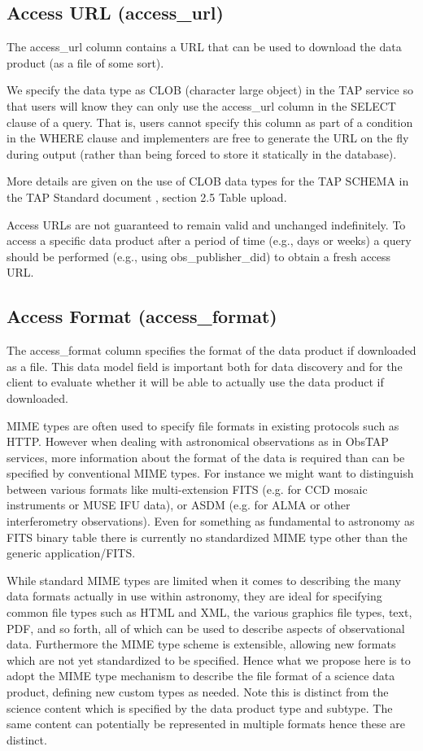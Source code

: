 \documentclass[11pt,a4paper]{ivoa}
\begin{document}
\subsection{Access URL (access\_url)}
The access\_url column contains a URL that can be used to download the data product (as a file of some sort).

We specify the data type as CLOB (character large object) in the TAP service so that users will know they can only use
the access\_url column in the SELECT clause of a query.  That is, users cannot specify this column as part of a
condition in the WHERE clause and implementers are free to generate the URL on the fly during output (rather than being
forced to store it statically in the database).

More details are given on the use of CLOB data types for the TAP SCHEMA in the TAP Standard document
\cite{CITATIONTAPl1036}, section 2.5 Table upload.

Access URLs are not guaranteed to remain valid and unchanged indefinitely.  To access a specific data product after a
period of time (e.g., days or weeks) a query should be performed (e.g., using obs\_publisher\_did) to obtain a fresh
access URL.

\subsection{Access Format (access\_format)}
\label{bkm:Ref289893457}The access\_format column specifies the format of the data product if downloaded as a file. This
data model field is important both for data discovery and for the client to evaluate whether it will be able to
actually use the data product if downloaded.

MIME types are often used to specify file formats in existing protocols such as HTTP\cite{CITATIONIntl1036}.  However
when dealing with astronomical observations as in ObsTAP services, more information about the format of the data is
required than can be specified by conventional MIME types.  For instance we might want to distinguish between various
formats like multi-extension FITS (e.g. for CCD mosaic instruments or MUSE IFU data), or ASDM (e.g. for ALMA or other
interferometry observations).  Even for something as fundamental to astronomy as FITS binary table there is currently
no standardized MIME type other than the generic application/FITS.

While standard MIME types are limited when it comes to describing the many data formats actually in use within
astronomy, they are ideal for specifying common file types such as HTML and XML, the various graphics file types, text,
PDF, and so forth, all of which can be used to describe aspects of observational data.  Furthermore the MIME type
scheme is extensible, allowing new formats which are not yet standardized to be specified.  Hence what we propose here
is to adopt the MIME type mechanism to describe the file format of a science data product, defining new custom types as
needed.  Note this is distinct from the science content which is specified by the data product type and subtype.  The
same content can potentially be represented in multiple formats hence these are distinct.
\end{document}

